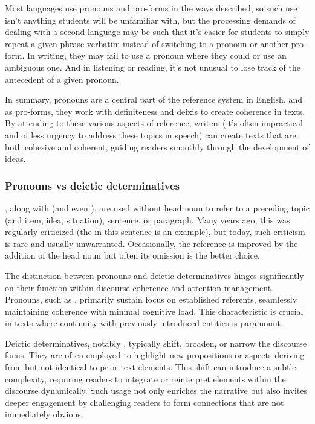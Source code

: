 Most languages use pronouns and pro-forms in the ways described, so such use isn't anything students will be unfamiliar with, but the processing demands of dealing with a second language may be such that it's easier for students to simply repeat a given phrase verbatim instead of switching to a pronoun or another pro-form. In writing, they may fail to use a pronoun where they could or use an ambiguous one. And in listening or reading, it's not unusual to lose track of the antecedent of a given pronoun.

In summary, pronouns are a central part of the reference system in English, and as pro-forms, they work with definiteness and deixis to create coherence in texts. By attending to these various aspects of reference, writers (it's often impractical and of less urgency to address these topics in speech) can create texts that are both cohesive and coherent, guiding readers smoothly through the development of ideas.

\subsubsection*{Pronouns vs deictic determinatives}
, along with  (and even ), are used without head noun to refer to a preceding topic (and item, idea, situation), sentence, or paragraph. Many years ago, this was regularly criticized (the  in this sentence is an example), but today, such criticism is rare and usually unwarranted. Occasionally, the reference is improved by the addition of the head noun but often its omission is the better choice.

The distinction between pronouns and deictic determinatives hinges significantly on their function within discourse coherence and attention management. Pronouns, such as , primarily sustain focus on established referents, seamlessly maintaining coherence with minimal cognitive load. This characteristic is crucial in texts where continuity with previously introduced entities is paramount.

Deictic determinatives, notably , typically shift, broaden, or narrow the discourse focus. They are often employed to highlight new propositions or aspects deriving from but not identical to prior text elements. This shift can introduce a subtle complexity, requiring readers to integrate or reinterpret elements within the discourse dynamically. Such usage not only enriches the narrative but also invites deeper engagement by challenging readers to form connections that are not immediately obvious.

